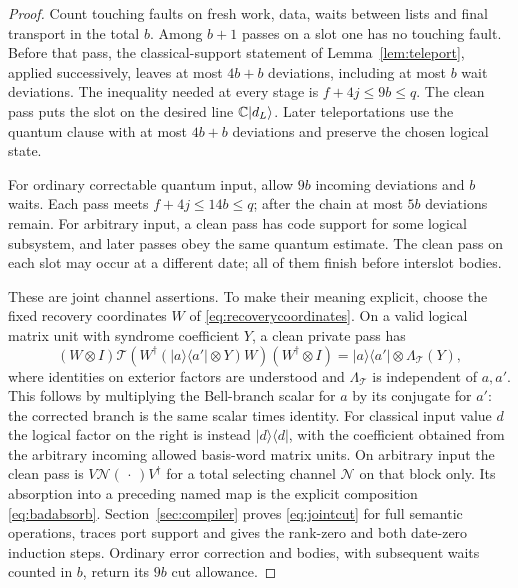 \begin{proof}
Count touching faults on fresh work, data, waits between lists and final transport in the total $b$. Among $b+1$ passes on a slot one has no touching fault. Before that pass, the classical-support statement of Lemma~\ref{lem:teleport}, applied successively, leaves at most $4b+b$ deviations, including at most $b$ wait deviations. The inequality needed at every stage is $f+4j\le9b\le q$. The clean pass puts the slot on the desired line $\mathbb C\lvert d_L\rangle$. Later teleportations use the quantum clause with at most $4b+b$ deviations and preserve the chosen logical state.

For ordinary correctable quantum input, allow $9b$ incoming deviations and $b$ waits. Each pass meets $f+4j\le14b\le q$; after the chain at most $5b$ deviations remain. For arbitrary input, a clean pass has code support for some logical subsystem, and later passes obey the same quantum estimate. The clean pass on each slot may occur at a different date; all of them finish before interslot bodies.

These are joint channel assertions. To make their meaning explicit, choose the fixed recovery coordinates $W$ of \eqref{eq:recoverycoordinates}. On a valid logical matrix unit with syndrome coefficient $Y$, a clean private pass has
\[
 (W\otimes I)\mathcal T\!\left(
 W^\dagger(|a\rangle\langle a'|\otimes Y)W\right)(W^\dagger\otimes I)
   =|a\rangle\langle a'|\otimes\Lambda_{\mathcal T}(Y),
\]
where identities on exterior factors are understood and $\Lambda_{\mathcal T}$ is independent of $a,a'$. This follows by multiplying the Bell-branch scalar for $a$ by its conjugate for $a'$: the corrected branch is the same scalar times identity. For classical input value $d$ the logical factor on the right is instead $|d\rangle\langle d|$, with the coefficient obtained from the arbitrary incoming allowed basis-word matrix units. On arbitrary input the clean pass is $V\mathcal N(\,\cdot\,)V^\dagger$ for a total selecting channel $\mathcal N$ on that block only. Its absorption into a preceding named map is the explicit composition \eqref{eq:badabsorb}. Section~\ref{sec:compiler} proves \eqref{eq:jointcut} for full semantic operations, traces port support and gives the rank-zero and both date-zero induction steps. Ordinary error correction and bodies, with subsequent waits counted in $b$, return its $9b$ cut allowance.


\end{proof}
